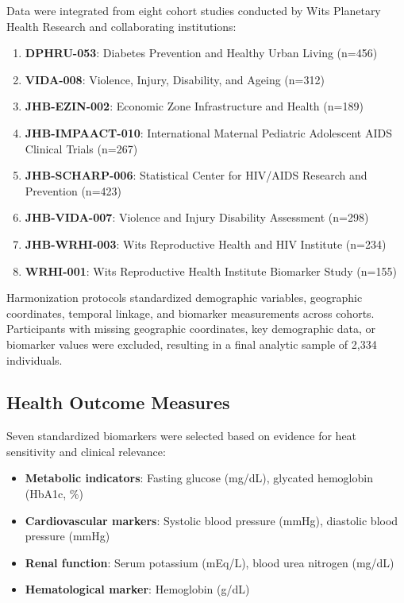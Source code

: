 \documentclass[journal,article,submit,pdftex,moreauthors]{Definitions/mdpi}
\begin{document}
Data were integrated from eight cohort studies conducted by Wits Planetary Health Research and collaborating institutions:

\begin{enumerate}
\item \textbf{DPHRU-053}: Diabetes Prevention and Healthy Urban Living (n=456)
\item \textbf{VIDA-008}: Violence, Injury, Disability, and Ageing (n=312)  
\item \textbf{JHB-EZIN-002}: Economic Zone Infrastructure and Health (n=189)
\item \textbf{JHB-IMPAACT-010}: International Maternal Pediatric Adolescent AIDS Clinical Trials (n=267)
\item \textbf{JHB-SCHARP-006}: Statistical Center for HIV/AIDS Research and Prevention (n=423)
\item \textbf{JHB-VIDA-007}: Violence and Injury Disability Assessment (n=298)
\item \textbf{JHB-WRHI-003}: Wits Reproductive Health and HIV Institute (n=234)
\item \textbf{WRHI-001}: Wits Reproductive Health Institute Biomarker Study (n=155)
\end{enumerate}

Harmonization protocols standardized demographic variables, geographic coordinates, temporal linkage, and biomarker measurements across cohorts. Participants with missing geographic coordinates, key demographic data, or biomarker values were excluded, resulting in a final analytic sample of 2,334 individuals.

\subsection{Health Outcome Measures}

Seven standardized biomarkers were selected based on evidence for heat sensitivity and clinical relevance:

\begin{itemize}
\item \textbf{Metabolic indicators}: Fasting glucose (mg/dL), glycated hemoglobin (HbA1c, \%)
\item \textbf{Cardiovascular markers}: Systolic blood pressure (mmHg), diastolic blood pressure (mmHg)
\item \textbf{Renal function}: Serum potassium (mEq/L), blood urea nitrogen (mg/dL)
\item \textbf{Hematological marker}: Hemoglobin (g/dL)
\end{itemize}
\end{document}
